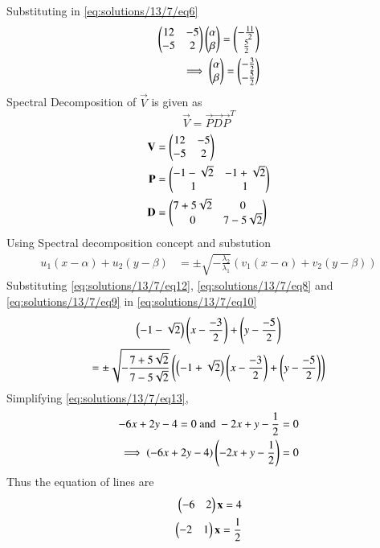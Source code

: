 Substituting in \eqref{eq:solutions/13/7/eq6}
\begin{align}
	\label{eq:solutions/13/7/eq11}\begin{pmatrix} 12 & -5\\-5 & 2\end{pmatrix}\begin{pmatrix}\alpha \\ \beta\end{pmatrix} = \begin{pmatrix}-\frac{11}{2} \\ \frac{5}{2}\end{pmatrix} \\
	\label{eq:solutions/13/7/eq12}\implies \begin{pmatrix}\alpha \\ \beta\end{pmatrix} = \begin{pmatrix}-\frac{3}{2} \\ -\frac{5}{2}\end{pmatrix}
\end{align}
Spectral Decomposition  of $\vec{V}$ is given as
\begin{equation}
\vec{V} = \vec{P}\vec{D}\vec{P}^T
\end{equation}
\begin{align}
	\label{eq:solutions/13/7/eq7}\mathbf{V} &= \begin{pmatrix} 12 & -5\\ -5 & 2\end{pmatrix}\\
	\label{eq:solutions/13/7/eq8}\mathbf{P} &= \begin{pmatrix}-1-\sqrt{2} & -1 + \sqrt{2}\\ 1 & 1\end{pmatrix}\\
	\label{eq:solutions/13/7/eq9}\mathbf{D} &= \begin{pmatrix}7 + 5\sqrt{2} & 0\\ 0 & 7 - 5\sqrt{2}\end{pmatrix}
\end{align}
Using Spectral decomposition concept and substution
\begin{align}
u_1(x-\alpha) + u_2(y-\beta) &= \pm \sqrt{-\frac{\lambda_2}{\lambda_1}}(v_1(x-\alpha) + v_2(y-\beta))\label{eq:solutions/13/7/eq10}
\end{align}
Substituting \eqref{eq:solutions/13/7/eq12}, \eqref{eq:solutions/13/7/eq8} and \eqref{eq:solutions/13/7/eq9} in \eqref{eq:solutions/13/7/eq10}
\begin{multline}\label{eq:solutions/13/7/eq13}
	\left(-1-\sqrt{2}\right)\left(x- \frac{-3}{2}\right) + \left(y-\frac{-5}{2}\right) \\= \pm \sqrt{-\frac{7 +5\sqrt{2}} {7-5\sqrt{2}}}\left(\left(-1+\sqrt{2}\right)\left(x- \frac{-3}{2}\right) + \left(y-\frac{-5}{2}\right)\right)
\end{multline}
Simplifying \eqref{eq:solutions/13/7/eq13},
\begin{align}
	\label{eq:solutions/13/7/eq22}-6x + 2y - 4 = 0 \text{ and } -2x + y -\frac{1}{2} = 0\\
	\implies \left(-6x + 2y - 4\right)\left(-2x + y -\frac{1}{2}\right) = 0
\end{align}
Thus the equation of lines are
\begin{align}
\begin{pmatrix}-6&2\end{pmatrix}\mathbf{x} = 4\\ 
\begin{pmatrix}-2&1\end{pmatrix}\mathbf{x} = \frac{1}{2}
\end{align}
